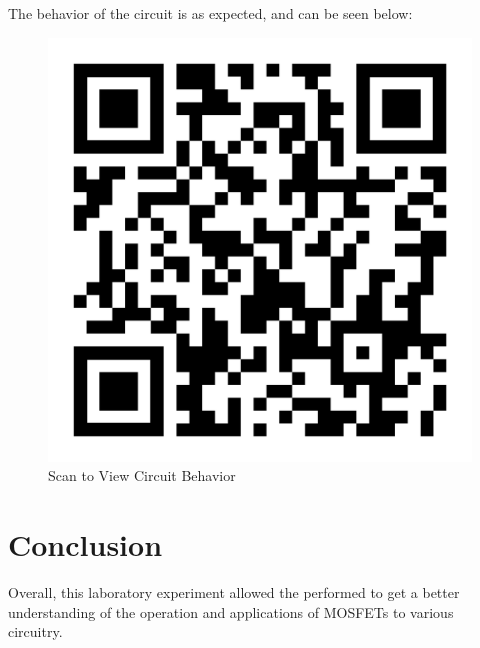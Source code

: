 \documentclass[
	letterpaper, %
	10pt, %
]{CSUniSchoolLabReport}
\begin{document}
The behavior of the circuit is as expected, and can be seen below:

\begin{figure}[H]
  \centering
  \includegraphics[width=.4\textwidth]{Figures/L5F8}
  \caption{Scan to View Circuit Behavior}
  \label{fig:8}
\end{figure}

\section{Conclusion}

Overall, this laboratory experiment allowed the performed to get a better understanding of the operation and applications of MOSFETs to various circuitry.
\end{document}
